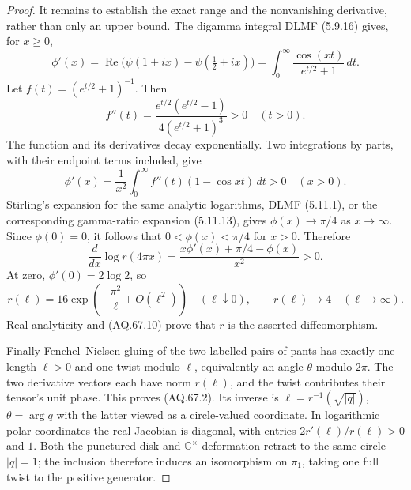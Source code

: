 \documentclass[11pt,a4paper]{article}
\theoremstyle{definition}\newtheorem{definition}[theorem]{Definition}
\theoremstyle{remark}\newtheorem{remark}[theorem]{Remark}
\begin{document}
\begin{proof}
It remains to establish the exact range and the nonvanishing
derivative, rather than only an upper bound. The digamma integral
DLMF (5.9.16) gives, for $x\geq0$,
\[
 \phi'(x)=\operatorname{Re}\bigl(\psi(1+ix)
                            -\psi(\tfrac12+ix)\bigr)
           =\int_0^\infty\frac{\cos(xt)}{e^{t/2}+1}\,dt.
                                                               \tag{AQ.67.8}
\]
Let $f(t)=(e^{t/2}+1)^{-1}$. Then
\[
 f''(t)=\frac{e^{t/2}(e^{t/2}-1)}{4(e^{t/2}+1)^3}>0
               \quad(t>0).
\]
The function and its derivatives decay exponentially. Two
integrations by parts, with their endpoint terms included, give
\[
 \phi'(x)=\frac1{x^2}\int_0^\infty f''(t)(1-\cos xt)\,dt>0
                  \quad(x>0).                                \tag{AQ.67.9}
\]
Stirling's expansion for the same analytic logarithms, DLMF
(5.11.1), or the corresponding gamma-ratio expansion (5.11.13),
gives $\phi(x)\longrightarrow\pi/4$ as $x\to\infty$.
Since $\phi(0)=0$, it follows that
$0<\phi(x)<\pi/4$ for $x>0$. Therefore
\[
 \frac{d}{dx}\log r(4\pi x)
       =\frac{x\phi'(x)+\pi/4-\phi(x)}{x^2}>0.                 \tag{AQ.67.10}
\]
At zero, $\phi'(0)=2\log2$, so
\[
 r(\ell)=16\exp\left(-\frac{\pi^2}{\ell}+O(\ell^2)\right)
              \quad(\ell\downarrow0),
 \qquad r(\ell)\longrightarrow4\quad(\ell\to\infty).
\]
Real analyticity and (AQ.67.10) prove that $r$ is the asserted
diffeomorphism.

Finally Fenchel--Nielsen gluing of the two labelled pairs of
pants has exactly one length $\ell>0$ and one twist modulo
$\ell$, equivalently an angle $\theta$ modulo $2\pi$.
The two derivative vectors each have norm $r(\ell)$, and
the twist contributes their tensor's unit phase. This proves
(AQ.67.2). Its inverse is
$\ell=r^{-1}(\sqrt{|q|})$, $\theta=\arg q$ with the latter
viewed as a circle-valued coordinate. In logarithmic polar
coordinates the real Jacobian is diagonal, with entries
$2r'(\ell)/r(\ell)>0$ and $1$. Both the punctured disk and
$\mathbb C^\times$ deformation retract to the same circle
$|q|=1$; the inclusion therefore induces an isomorphism on
$\pi_1$, taking one full twist to the positive generator.
\end{proof}
\end{document}
